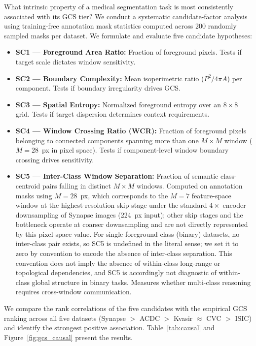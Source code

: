 What intrinsic property of a medical segmentation task is most consistently associated with its GCS tier? We conduct a systematic candidate-factor analysis using training-free annotation mask statistics computed across 200 randomly sampled masks per dataset. We formulate and evaluate five candidate hypotheses:
\begin{itemize}
  \item \textbf{SC1 --- Foreground Area Ratio:} Fraction of foreground pixels. Tests if target scale dictates window sensitivity.
  \item \textbf{SC2 --- Boundary Complexity:} Mean isoperimetric ratio ($P^2/4\pi A$) per component. Tests if boundary irregularity drives GCS.
  \item \textbf{SC3 --- Spatial Entropy:} Normalized foreground entropy over an $8{\times}8$ grid. Tests if target dispersion determines context requirements.
  \item \textbf{SC4 --- Window Crossing Ratio (WCR):} Fraction of foreground pixels belonging to connected components spanning more than one $M{\times}M$ window ($M{=}28$~px in pixel space). Tests if component-level window boundary crossing drives sensitivity.
  \item \textbf{SC5 --- Inter-Class Window Separation:} Fraction of semantic class-centroid pairs falling in distinct $M{\times}M$ windows. Computed on annotation masks using $M{=}28$~px, which corresponds to the $M{=}7$ feature-space window at the highest-resolution skip stage under the standard $4\times$ encoder downsampling of Synapse images (224~px input); other skip stages and the bottleneck operate at coarser downsampling and are not directly represented by this pixel-space value. For single-foreground-class (binary) datasets, no inter-class pair exists, so SC5 is undefined in the literal sense; we set it to zero by convention to encode the absence of inter-class separation. This convention does not imply the absence of within-class long-range or topological dependencies, and SC5 is accordingly not diagnostic of within-class global structure in binary tasks. Measures whether multi-class reasoning requires cross-window communication.
\end{itemize}

We compare the rank correlations of the five candidates with the empirical GCS ranking across all five datasets (Synapse $>$ ACDC $>$ Kvasir $\approx$ CVC $>$ ISIC) and identify the strongest positive association. Table~\ref{tab:causal} and Figure~\ref{fig:gcs_causal} present the results.

